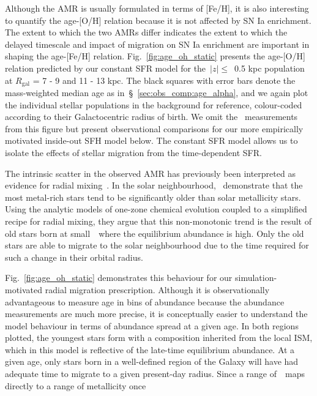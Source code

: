 \documentclass[draft2.tex]{subfiles}
\begin{document}
Although the AMR is usually formulated in terms of 
[Fe/H], it is also interesting to quantify the age-[O/H] relation because it 
is not affected by SN Ia enrichment. 
The extent to which the two AMRs differ indicates the extent to which the 
delayed timescale and impact of migration on SN Ia enrichment are important in 
shaping the age-[Fe/H] relation. 
Fig.~\ref{fig:age_oh_static} presents the age-[O/H] relation predicted by our 
constant SFR model for the~$\left|z\right|\leq$~0.5 kpc population at 
$R_\text{gal}$ = 7 - 9 and 11 - 13 kpc. 
The black squares with error bars denote the mass-weighted median age as 
in~\S~\ref{sec:obs_comp:age_alpha}, and we again plot the individual stellar 
populations in the background for reference, colour-coded according to their 
Galactocentric radius of birth. 
We omit the~\citet{Feuillet2019} measurements from this figure but present 
observational comparisons for our more empirically motivated inside-out SFH 
model below. 
The constant SFR model allows us to isolate the effects of stellar migration 
from the time-dependent SFR. 
\par 
The intrinsic scatter in the observed AMR has previously been interpreted as 
evidence for radial mixing~\citep{Edvardsson1993, Sellwood2002}. 
In the solar neighbourhood,~\citet{Feuillet2018} demonstrate that the most 
metal-rich stars tend to be significantly older than solar metallicity stars. 
Using the \citet{Weinberg2017} analytic models of one-zone chemical evolution 
coupled to a simplified recipe for radial mixing, they argue that this 
non-monotonic trend is the result of old stars born at small~\rgal~where the 
equilibrium abundance is high. 
Only the old stars are able to migrate to the solar neighbourhood due to the 
time required for such a change in their orbital radius. 
\par 
Fig.~\ref{fig:age_oh_static} demonstrates this behaviour for our 
simulation-motivated radial migration prescription. Although it is 
observationally advantageous to measure age in bins of abundance because the 
abundance measurements are much more precise, it is conceptually easier to 
understand the model behaviour in terms of abundance spread at a given age. 
In both regions plotted, the youngest stars form with a composition inherited 
from the local ISM, which in this model is reflective of the late-time 
equilibrium abundance. 
At a given age, only stars born in a well-defined region of the 
Galaxy will have had adequate time to migrate to a given present-day radius. 
Since a range of~\rgal~maps directly to a range of metallicity once 
\end{document}
